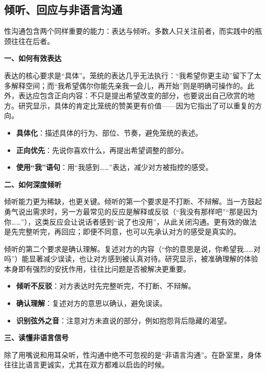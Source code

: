 \documentclass[12pt,UTF8]{ctexbook}
\begin{document}
\subsection{倾听、回应与非语言沟通}

性沟通包含两个同样重要的能力：表达与倾听。多数人只关注前者，而实践中的瓶颈往往在后者。

\textbf{一、如何有效表达}

表达的核心要求是“具体”。笼统的表达几乎无法执行：“我希望你更主动”留下了太多解释空间；而“我希望偶尔你能先亲我一会儿，再开始”则是明确可操作的。此外，表达应包含正向内容：不只是提出希望改变的部分，也要说出自己欣赏的地方。研究显示，具体的肯定比笼统的赞美更有价值——因为它指出了可以重复的方向。

\begin{itemize}
\item \textbf{具体化}：描述具体的行为、部位、节奏，避免笼统的表述。
\item \textbf{正向优先}：先说你喜欢什么，再提出希望调整的部分。
\item \textbf{使用“我”语句}：用“我感到……”表达，减少对方被指控的感受。
\end{itemize}

\textbf{二、如何深度倾听}

倾听能力更为稀缺，也更关键。倾听的第一个要求是不打断、不辩解。当一方鼓起勇气说出需求时，另一方最常见的反应是解释或反驳（“我没有那样吧”“那是因为你……”），这类反应会让说话者感到“说了也没用”，从此关闭沟通。更有效的做法是先完整听完，再回应；即便不同意，也可以先承认对方的感受是真实的。

倾听的第二个要求是确认理解。复述对方的内容（“你的意思是说，你希望我……对吗”）能显著减少误读，也让对方感到被认真对待。研究显示，被准确理解的体验本身即有强烈的安抚作用，往往比问题是否被解决更重要。

\begin{itemize}
\item \textbf{倾听不反驳}：对方表达时先完整听完，不打断、不辩解。
\item \textbf{确认理解}：复述对方的意思以确认，避免误读。
\item \textbf{识别弦外之音}：注意对方未直说的部分，例如抱怨背后隐藏的渴望。
\end{itemize}

\textbf{三、读懂非语言信号}

除了用嘴说和用耳朵听，性沟通中绝不可忽视的是“非语言沟通”。在卧室里，身体往往比语言更诚实，尤其在双方都难以启齿的时候。
\end{document}
